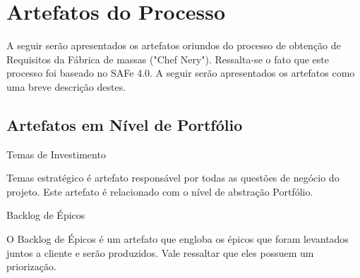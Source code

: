 {
	\large{\section {Artefatos do Processo \\} }

	\tab A seguir serão apresentados os artefatos oriundos do processo de obtenção de Requisitos da Fábrica de massas ("Chef Nery"). Ressalta-se o fato que este processo foi baseado no SAFe 4.0. A seguir serão apresentados os artefatos como uma breve descrição destes. \\

}

{\large{\subsection{Artefatos em Nível de Portfólio \\}}}
\begin{itemize}

{
	\large{\item Temas de Investimento \\}

	\tab Temas estratégico é artefato responsável por todas as questões de negócio do projeto. Este artefato é relacionado com o nível de abstração Portfólio. \\
}


{
	\large{\item Backlog de  Épicos \\}

	\tab O Backlog de Épicos é um artefato que engloba os épicos que foram levantados juntos a cliente e serão produzidos. Vale ressaltar que eles possuem um priorização. \\
}
\end{itemize}

